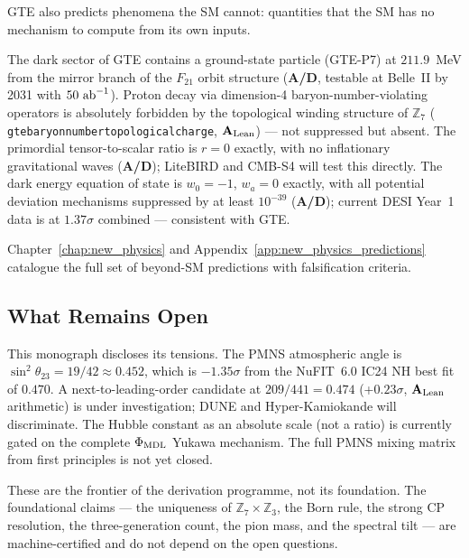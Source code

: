 \documentclass[11pt,openany]{book}
\theoremstyle{remark}
\newcommand{\lean}[1]{%
  \penalty-100
  \begingroup\def\_{\textunderscore\allowbreak}\texttt{#1}\endgroup}
\newcommand{\CatAL}{\ensuremath{\textbf{A}_{\rm Lean}}}
\newcommand{\CatAD}{\textbf{A/D}}
\begin{document}
GTE also predicts phenomena the SM cannot: quantities that the SM has no mechanism to
compute from its own inputs.

The dark sector of GTE contains a ground-state particle (GTE-P7) at $211.9$~MeV
from the mirror branch of the $F_{21}$ orbit structure (\CatAD, testable at Belle~II
by 2031 with $50~{\rm ab}^{-1}$).
Proton decay via dimension-4 baryon-number-violating operators is absolutely forbidden
by the topological winding structure of $\mathbb{Z}_7$
(\lean{gte\_baryon\_number\_topological\_charge}, \CatAL) --- not suppressed but absent.
The primordial tensor-to-scalar ratio is $r = 0$ exactly, with no inflationary
gravitational waves (\CatAD); LiteBIRD and CMB-S4 will test this directly.
The dark energy equation of state is $w_0 = -1$, $w_a = 0$ exactly, with all
potential deviation mechanisms suppressed by at least $10^{-39}$ (\CatAD); current
DESI Year~1 data is at $1.37\sigma$ combined --- consistent with GTE.

Chapter~\ref{chap:new_physics} and Appendix~\ref{app:new_physics_predictions} catalogue the full set of beyond-SM
predictions with falsification criteria.

\subsection*{What Remains Open}

This monograph discloses its tensions.
The PMNS atmospheric angle is $\sin^2\theta_{23} = 19/42 \approx 0.452$, which is
$-1.35\sigma$ from the NuFIT~6.0 IC24 NH best fit of $0.470$.
A next-to-leading-order candidate at $209/441 = 0.474$ (+$0.23\sigma$, \CatAL
arithmetic) is under investigation; DUNE and Hyper-Kamiokande will discriminate.
The Hubble constant as an absolute scale (not a ratio) is currently gated on the
complete $\Phi_{\rm MDL}$ Yukawa mechanism.
The full PMNS mixing matrix from first principles is not yet closed.

These are the frontier of the derivation programme, not its foundation.
The foundational claims --- the uniqueness of $\mathbb{Z}_7\times\mathbb{Z}_3$, the
Born rule, the strong CP resolution, the three-generation count, the pion mass, and the
spectral tilt --- are machine-certified and do not depend on the open questions.
\end{document}
